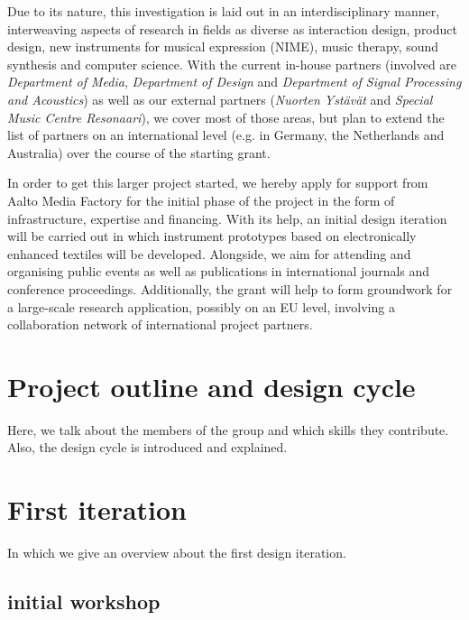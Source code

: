 \documentclass{acm_proc_article-sp}
\begin{document}
Due to its nature, this investigation is laid out in an interdisciplinary manner, interweaving aspects of research in fields as diverse as interaction design, product design, new instruments for musical expression (NIME), music therapy, sound synthesis and computer science. 
With the current in-house partners (involved are \emph{Department of Media}, \emph{Department of Design} and \emph{Department of Signal Processing and Acoustics}) as well as our external partners (\emph{Nuorten Ystävät} and \emph{Special Music Centre Resonaari}), we cover most of those areas, but plan to extend the list of partners on an international level (e.g. in Germany, the Netherlands and Australia) over the course of the starting grant.

In order to get this larger project started, we hereby apply for support from Aalto Media Factory for the initial phase of the project in the form of infrastructure, expertise and financing. 
With its help, an initial design iteration will be carried out in which instrument prototypes based on electronically enhanced textiles will be developed.
Alongside, we aim for attending and organising public events as well as publications in international journals and conference proceedings.
Additionally, the grant will help to form groundwork for a large-scale research application, possibly on an EU level, involving a collaboration network of international project partners.

\section{Project outline and design cycle} %
\label{sec:timeline}

Here, we talk about the members of the group and which skills they contribute.
Also, the design cycle is introduced and explained.


\section{First iteration} %
\label{sec:first_iteration}

In which we give an overview about the first design iteration.

\subsection{initial workshop} %
\label{sub:initial_workshop}
\end{document}

